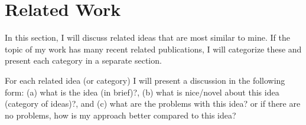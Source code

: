 \section{Related Work}
\label{sec:relatedwork}

In this section, I will discuss related ideas that 
are most similar to mine. If the topic of my work 
has many recent related publications, I will categorize
these and present each category in a separate section.

For each related idea (or category) I will present a 
discussion in the following form: (a) what is the idea
(in brief)?, (b) what is nice/novel about this 
idea (category of ideas)?, and (c) what are the problems
with this idea? or if there are no problems, how is 
my approach better compared to this idea?
